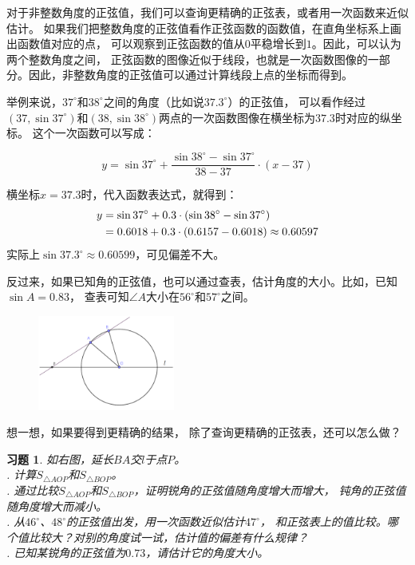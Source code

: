 \documentclass[12pt,UTF8]{ctexbook}
\newtheorem{xt}{习题}[section]
\begin{document}
对于非整数角度的正弦值，我们可以查询更精确的正弦表，或者用一次函数来近似估计。
如果我们把整数角度的正弦值看作正弦函数的函数值，在直角坐标系上画出函数值对应的点，
可以观察到正弦函数的值从$0$平稳增长到$1$。因此，可以认为两个整数角度之间，
正弦函数的图像近似于线段，也就是一次函数图像的一部分。因此，非整数角度的正弦值可以通过计算线段上点的坐标而得到。

举例来说，$37^\circ$和$38^\circ$之间的角度（比如说$37.3^\circ$）的正弦值，
可以看作经过$(37, \sin 37^\circ)$和$(38, \sin 38^\circ)$两点的一次函数图像在横坐标为$37.3$时对应的纵坐标。
这个一次函数可以写成：

$$ y = \sin 37^\circ + \frac{\sin 38^\circ - \sin 37^\circ}{38 - 37} \cdot (x - 37)$$

横坐标$x=37.3$时，代入函数表达式，就得到：
\begin{align}
    y &= \sin 37^\circ + 0.3\cdot(\sin 38^\circ - \sin 37^\circ ) \notag \\
    &= 0.6018 + 0.3 \cdot (0.6157 - 0.6018) \approx 0.60597 \notag
\end{align}
实际上$\sin 37.3^\circ \approx 0.60599$，可见偏差不大。

反过来，如果已知角的正弦值，也可以通过查表，估计角度的大小。比如，已知$\sin A = 0.83$，
查表可知$\angle A$大小在$56^\circ$和$57^\circ$之间。

\begin{figure} %
    \vspace{-25pt}
    \flushright
    \includegraphics[width=0.4\textwidth]{正弦习题1.png}
\end{figure}

想一想，如果要得到更精确的结果，
除了查询更精确的正弦表，还可以怎么做？

\begin{xt}
    如右图，延长$BA$交$l$于点$P$。\\
    . 计算$S_{\triangle AOP}$和$S_{\triangle BOP}$。 \\
    . 通过比较$S_{\triangle AOP}$和$S_{\triangle BOP}$，证明锐角的正弦值随角度增大而增大，
    钝角的正弦值随角度增大而减小。 \\
    . 从$46^\circ$、$48^\circ$的正弦值出发，用一次函数近似估计$47^\circ$，
    和正弦表上的值比较。哪个值比较大？对别的角度试一试，估计值的偏差有什么规律？ \\
    . 已知某锐角的正弦值为$0.73$，请估计它的角度大小。
\end{xt}
\end{document}

